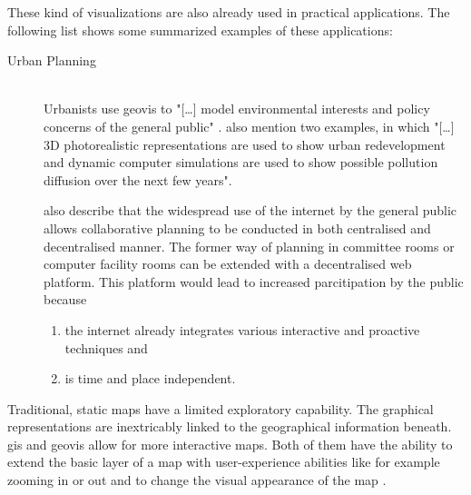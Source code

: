 These kind of visualizations are also already used in practical applications. The following list shows some summarized examples of these applications:
\begin{description}

\item[Urban Planning] \hfill \\
Urbanists use \ac{geovis} to "[\ldots] model environmental interests and policy concerns of the general public" . \citeauthor{Jiang2003} also mention two examples, in which "[\ldots] 3D photorealistic representations are used to show urban redevelopment and dynamic computer simulations are used to show possible pollution diffusion over the next few years".

\citeauthor{Jiang2003} also describe that the widespread use of the internet by the general public allows collaborative planning to be conducted in both centralised and decentralised manner. The former way of planning in committee rooms or computer facility rooms can be extended with a decentralised web platform. This platform would lead to increased parcitipation by the public because
\begin{enumerate}
\item the internet already integrates various interactive and proactive techniques and
\item is time and place independent.
\end{enumerate}


\end{description}


Traditional, static maps have a limited exploratory capability. The graphical representations are inextricably linked to the geographical information beneath. \ac{gis} and \ac{geovis} allow for more interactive maps. Both of them have the ability to extend the basic layer of a map with user-experience abilities like for example zooming in or out and to change the visual appearance of the map .